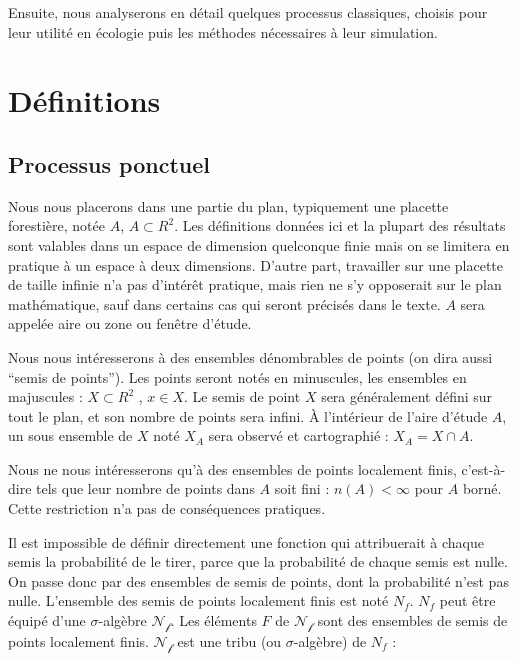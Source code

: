 \documentclass[
  11pt,
  french,
  A4paper,
  extrafontsizes,onecolumn,openright
  ]{memoir}
\theoremstyle{definition}
\theoremstyle{definition}
\theoremstyle{definition}
\theoremstyle{remark}
\begin{document}
Ensuite, nous analyserons en détail quelques processus classiques,
choisis pour leur utilité en écologie puis les méthodes nécessaires à
leur simulation.

\section{Définitions}\label{definitions}

\subsection{Processus ponctuel}\label{processus-ponctuel}

Nous nous placerons dans une partie du plan, typiquement une placette
forestière, notée \(A\), \(A \subset R^2\). Les définitions données ici
et la plupart des résultats sont valables dans un espace de dimension
quelconque finie mais on se limitera en pratique à un espace à deux
dimensions. D'autre part, travailler sur une placette de taille infinie
n'a pas d'intérêt pratique, mais rien ne s'y opposerait sur le plan
mathématique, sauf dans certains cas qui seront précisés dans le texte.
\(A\) sera appelée aire ou zone ou fenêtre d'étude.

Nous nous intéresserons à des ensembles dénombrables de points (on dira
aussi ``semis de points''). Les points seront notés en minuscules, les
ensembles en majuscules : \(X \subset R^2\) , \(x \in X\). Le semis de
point \(X\) sera généralement défini sur tout le plan, et son nombre de
points sera infini. À l'intérieur de l'aire d'étude \(A\), un sous
ensemble de \(X\) noté \(X_A\) sera observé et cartographié :
\(X_A = X \cap A\).

Nous ne nous intéresserons qu'à des ensembles de points localement
finis, c'est-à-dire tels que leur nombre de points dans \(A\) soit fini
: \(n(A) < \infty\) pour \(A\) borné. Cette restriction n'a pas de
conséquences pratiques.

Il est impossible de définir directement une fonction qui attribuerait à
chaque semis la probabilité de le tirer, parce que la probabilité de
chaque semis est nulle. On passe donc par des ensembles de semis de
points, dont la probabilité n'est pas nulle. L'ensemble des semis de
points localement finis est noté \(N_f\). \(N_f\) peut être équipé d'une
\(\sigma\)-algèbre \(\mathcal{N_f}\). Les éléments \(F\) de
\(\mathcal{N_f}\) sont des ensembles de semis de points localement
finis. \(\mathcal{N_f}\) est une tribu (ou \(\sigma\)-algèbre) de
\(N_f\) :
\end{document}
